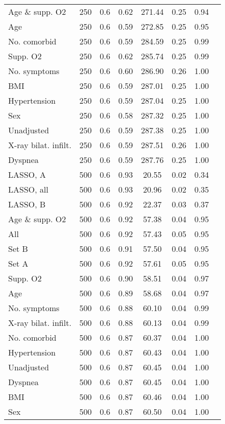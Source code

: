 \documentclass{article}
\begin{document}
{\begin{longtable}{lccccccc}
Age \& supp. O2 & 250 & 0.6 & 0.62 & 271.44 & 0.25 & 0.94\\
Age & 250 & 0.6 & 0.59 & 272.85 & 0.25 & 0.95\\
No. comorbid & 250 & 0.6 & 0.59 & 284.59 & 0.25 & 0.99\\
Supp. O2 & 250 & 0.6 & 0.62 & 285.74 & 0.25 & 0.99\\
No. symptoms & 250 & 0.6 & 0.60 & 286.90 & 0.26 & 1.00\\
BMI & 250 & 0.6 & 0.59 & 287.01 & 0.25 & 1.00\\
Hypertension & 250 & 0.6 & 0.59 & 287.04 & 0.25 & 1.00\\
Sex & 250 & 0.6 & 0.58 & 287.32 & 0.25 & 1.00\\
Unadjusted & 250 & 0.6 & 0.59 & 287.38 & 0.25 & 1.00\\
X-ray bilat. infilt. & 250 & 0.6 & 0.59 & 287.51 & 0.26 & 1.00\\
Dyspnea & 250 & 0.6 & 0.59 & 287.76 & 0.25 & 1.00\\ \midrule
LASSO, A & 500 & 0.6 & 0.93 & 20.55 & 0.02 & 0.34\\
LASSO, all & 500 & 0.6 & 0.93 & 20.96 & 0.02 & 0.35\\
LASSO, B & 500 & 0.6 & 0.92 & 22.37 & 0.03 & 0.37\\
Age \& supp. O2 & 500 & 0.6 & 0.92 & 57.38 & 0.04 & 0.95\\
All & 500 & 0.6 & 0.92 & 57.43 & 0.05 & 0.95\\
Set B & 500 & 0.6 & 0.91 & 57.50 & 0.04 & 0.95\\
Set A & 500 & 0.6 & 0.92 & 57.61 & 0.05 & 0.95\\
Supp. O2 & 500 & 0.6 & 0.90 & 58.51 & 0.04 & 0.97\\
Age & 500 & 0.6 & 0.89 & 58.68 & 0.04 & 0.97\\
No. symptoms & 500 & 0.6 & 0.88 & 60.10 & 0.04 & 0.99\\
X-ray bilat. infilt. & 500 & 0.6 & 0.88 & 60.13 & 0.04 & 0.99\\
No. comorbid & 500 & 0.6 & 0.87 & 60.37 & 0.04 & 1.00\\
Hypertension & 500 & 0.6 & 0.87 & 60.43 & 0.04 & 1.00\\
Unadjusted & 500 & 0.6 & 0.87 & 60.45 & 0.04 & 1.00\\
Dyspnea & 500 & 0.6 & 0.87 & 60.45 & 0.04 & 1.00\\
BMI & 500 & 0.6 & 0.87 & 60.46 & 0.04 & 1.00\\
Sex & 500 & 0.6 & 0.87 & 60.50 & 0.04 & 1.00\\

\end{longtable}}
\end{document}
